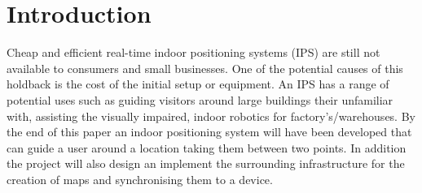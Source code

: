 \section{Introduction }\label{sec:intro}
Cheap and efficient real-time indoor positioning systems (IPS) are still not available to consumers and small businesses. One of the potential causes of this holdback is the cost of the initial setup or equipment. An IPS has a range of potential uses such as guiding visitors around large buildings their unfamiliar with, assisting the visually impaired, indoor robotics for factory’s/warehouses. By the end of this paper an indoor positioning system will have been developed that can guide a user around a location taking them between two points. In addition the project will also design an implement the surrounding infrastructure for the creation of maps and synchronising them to a device.